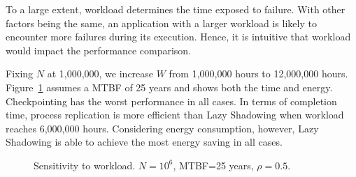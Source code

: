 To a large extent, workload determines the time exposed to failure. With other factors being the same, an application with a larger workload is likely to encounter more failures during its execution. Hence, it is intuitive that workload would impact the performance comparison. 

Fixing $N$ at 1,000,000, we increase $W$ from 1,000,000 hours to 12,000,000 hours. Figure~\ref{fig:w25} assumes a MTBF of 25 years and shows both the time and energy. Checkpointing has the worst performance in all cases. In terms of completion time, process replication is more efficient than Lazy Shadowing when workload reaches 6,000,000 hours. Considering energy consumption, however, Lazy Shadowing is able to achieve the most energy saving in all cases. %

\begin{figure}[!t]
	\begin{center}
	\end{center}
	\vskip -0.04in 
	\caption{Sensitivity to workload. $N=10^6$, MTBF=25 years, $\rho=0.5$.}
	\label{fig:w25}
\end{figure}
